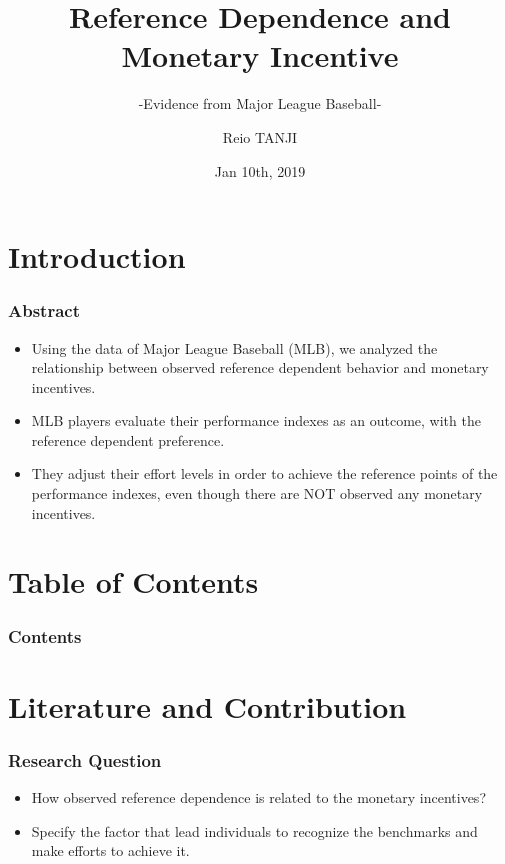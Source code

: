 \documentclass[dvipdfmx,12pt]{beamer}
\title{Reference Dependence and Monetary Incentive}
\subtitle{-Evidence from Major League Baseball-}
\author{Reio TANJI}
\date{Jan 10th, 2019}
\institute{Osaka University, Graduate Scool of Economics}
\begin{document}
\begin{frame}\frametitle{}
\titlepage
\end{frame}

\section{Introduction}

\begin{frame}\frametitle{Abstract}
  \begin{itemize}

    \item Using the data of Major League Baseball (MLB), we analyzed the relationship between observed reference dependent behavior and monetary incentives.

    \item MLB players evaluate their performance indexes as an outcome, with the reference dependent preference.

    \item They adjust their effort levels in order to achieve the reference points of the performance indexes, even though there are NOT observed any monetary incentives.
  \end{itemize}
\end{frame}

\section*{Table of Contents}
\begin{frame}\frametitle{Contents}
  \tableofcontents
\end{frame}

\section{Literature and Contribution}

\begin{frame}\frametitle{Research Question}
  \begin{itemize}
    \item How observed reference dependence is related to the monetary incentives?

    \item Specify the factor that lead individuals to recognize the benchmarks and make efforts to achieve it.
  \end{itemize}
\end{frame}
\end{document}
